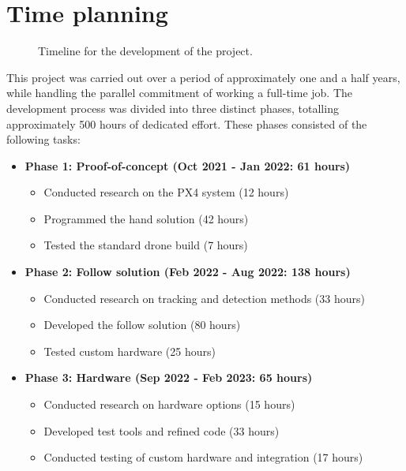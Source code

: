 \section{Time planning}
\label{sec:time-planning}

\begin{figure}[H]
  \centering
  \caption{Timeline for the development of the project.}
  \label{fig:project-timeline}
\end{figure}

This project was carried out over a period of approximately one and a half years, while handling the parallel commitment of working a full-time job. The development process was divided into three distinct phases, totalling approximately 500 hours of dedicated effort. These phases consisted of the following tasks:

\begin{itemize}
\item \textbf{Phase 1: Proof-of-concept (Oct 2021 - Jan 2022: 61 hours)}
\begin{itemize}
\item Conducted research on the PX4 system (12 hours)
\item Programmed the hand solution (42 hours)
\item Tested the standard drone build (7 hours)
\end{itemize}

\item \textbf{Phase 2: Follow solution (Feb 2022 - Aug 2022: 138 hours)}
\begin{itemize}
    \item Conducted research on tracking and detection methods (33 hours)
    \item Developed the follow solution (80 hours)
    \item Tested custom hardware (25 hours)
\end{itemize}

\item \textbf{Phase 3: Hardware (Sep 2022 - Feb 2023: 65 hours)}
\begin{itemize}
    \item Conducted research on hardware options (15 hours)
    \item Developed test tools and refined code (33 hours)
    \item Conducted testing of custom hardware and integration (17 hours)
\end{itemize}
\end{itemize}

